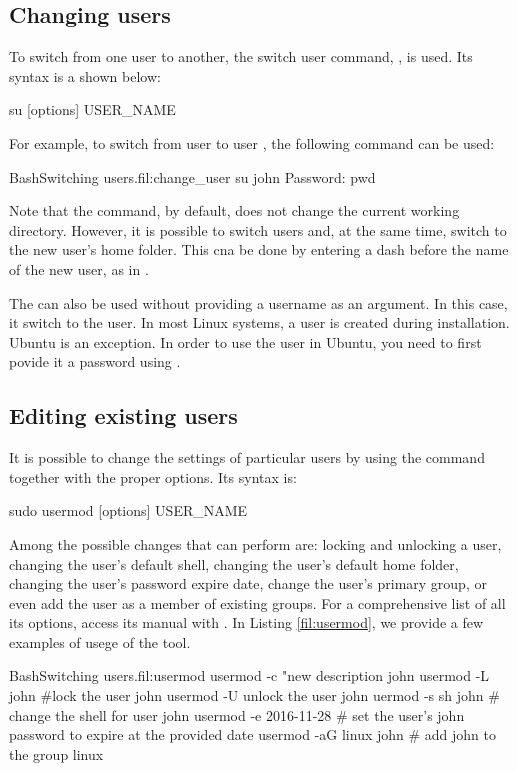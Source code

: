 \subsection{Changing users}

To switch from one user to another, the switch user command, , is used. Its syntax is a shown below:
\begin{command_line}
su [options] USER_NAME
\end{command_line}
For example, to switch from user  to user , the following command can be used:
\begin{command_line_float}{Bash}{Switching users.}{fil:change_user}
su john
Password:
pwd
\end{command_line_float}
Note that the  command, by default, does not change the current working directory. However, it is possible to switch users and, at the same time, switch to the new user's home folder. This cna be done by entering a dash before the name of the new user, as in .

The  can also be used without providing a username as an argument. In this case, it switch to the  user. In most Linux systems, a  user is created during installation. Ubuntu is an exception. In order to use the  user in Ubuntu, you need to first povide it a password using .


\subsection{Editing existing users}

It is possible to change the settings of particular users by using the  command together with the proper options. Its syntax is:
\begin{command_line}
sudo usermod [options] USER_NAME
\end{command_line}
Among the possible changes that  can perform are: locking and unlocking a user, changing the user's default shell, changing the user's default home folder, changing the user's password expire date, change the user's primary group, or even add the user as a member of existing groups. For a comprehensive list of all its options, access its manual with . In Listing \ref{fil:usermod}, we provide a few examples of usege of the  tool. 
\begin{command_line_float}{Bash}{Switching users.}{fil:usermod}
usermod -c "new description john
usermod -L john #lock the user john
usermod -U unlock the user john
uermod -s sh john # change the shell for user john
usermod -e 2016-11-28 # set the user's john password to expire at the provided date
usermod -aG linux john # add john to the group linux
\end{command_line_float}

